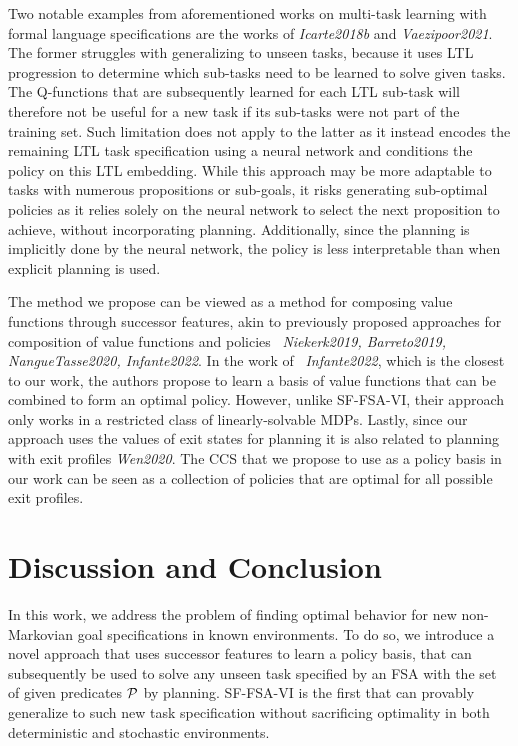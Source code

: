 Two notable examples from aforementioned works on multi-task learning with formal language specifications are the works of \textit{Icarte2018b} and \textit{Vaezipoor2021}. The former struggles with generalizing to unseen tasks, because it uses LTL progression to determine which sub-tasks need to be learned to solve given tasks. The Q-functions that are subsequently learned for each LTL sub-task will therefore not be useful for a new task if its sub-tasks were not part of the training set. Such limitation does not apply to the latter as it instead encodes the remaining LTL task specification using a neural network and conditions the policy on this LTL embedding. While this approach may be more adaptable to tasks with numerous propositions or sub-goals, it risks generating sub-optimal policies as it relies solely on the neural network to select the next proposition to achieve, without incorporating planning. Additionally, since the planning is implicitly done by the neural network, the policy is less interpretable than when explicit planning is used.

The method we propose can be viewed as a method for composing value functions through successor features, akin to previously proposed approaches for composition of value functions and policies ~\textit{Niekerk2019, Barreto2019, NangueTasse2020, Infante2022}. In the work of ~\textit{Infante2022}, which is the closest to our work, the authors propose to learn a basis of value functions that can be combined to form an optimal policy. However, unlike SF-FSA-VI, their approach only works in a restricted class of linearly-solvable MDPs. Lastly, since our approach uses the values of exit states for planning it is also related to planning with exit profiles \textit{Wen2020}. The CCS that we propose to use as a policy basis in our work can be seen as a collection of policies that are optimal for all possible exit profiles.

\section{Discussion and Conclusion}

In this work, we address the problem of finding optimal behavior for new non-Markovian goal specifications in known environments. To do so, we introduce a novel approach that uses successor features to learn a policy basis, that can subsequently be used to solve any unseen task specified by an FSA with the set of given predicates $\mathcal{P}$ by planning. SF-FSA-VI is the first that can provably generalize to such new task specification without sacrificing optimality in both deterministic and stochastic environments.

